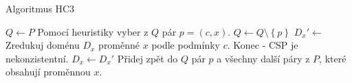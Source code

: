 \begin{algorithm}
\caption{Algoritmus HC3}
\label{HC3Algorithm}
\begin{algorithmic}[1]
\State $Q \gets P$
\State Pomocí heuristiky vyber z $Q$ pár $p = (c, x)$.
\State $Q \gets Q \setminus \left\{ p \right\}$
\State $D_x' \gets$ Zredukuj doménu $D_x$ proměnné $x$ podle podmínky $c$.
\State Konec - CSP je nekonzistentní.
\EndIf
{}
\State $D_x \gets D_x'$
\State Přidej zpět do $Q$ pár $p$ a všechny další páry z $P$, které obsahují proměnnou $x$.
\EndIf
\EndWhile
\EndProcedure
\end{algorithmic}
\end{algorithm}